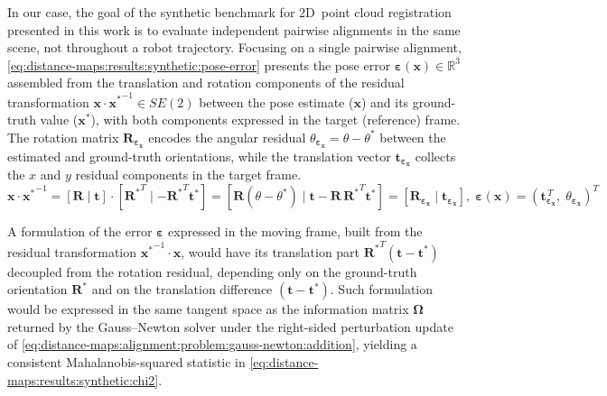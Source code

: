 In our case, the goal of the synthetic benchmark for 2D~point cloud
registration presented in this work is to evaluate independent pairwise
alignments in the same scene, not throughout a robot trajectory.
Focusing on a single pairwise alignment,
\eqref{eq:distance-maps:results:synthetic:pose-error} presents the pose
error $\boldsymbol{\varepsilon}\!\left(\mathbf{x}\right) \in \mathbb{R}^3$
assembled from the translation and rotation components of the residual
transformation $\mathbf{x}\cdot{\mathbf{x}^{*}}^{-1} \in SE(2)$ between
the pose estimate ($\mathbf{x}$) and its ground-truth value ($\mathbf{x}^*$),
with both components expressed in the target (reference) frame.
The rotation matrix $\mathbf{R}_{\boldsymbol{\varepsilon}_\mathbf{x}}$
encodes the angular residual
$\theta_{\boldsymbol{\varepsilon}_\mathbf{x}}=\theta-\theta^*$ between the
estimated and ground-truth orientations, while the translation vector
$\mathbf{t}_{\boldsymbol{\varepsilon}_\mathbf{x}}$ collects the $x$ and $y$
residual components in the target frame.
\begin{equation}
\label{eq:distance-maps:results:synthetic:pose-error}
\mathbf{x}\cdot{\mathbf{x}^{*}}^{-1} =
\left[\mathbf{R}\mid\mathbf{t}\right] \cdot
\left[{\mathbf{R}^*}^T \mid -{\mathbf{R}^*}^T\mathbf{t}^*\right] =
\left[\mathbf{R}(\theta-\theta^*) \;\big|\;
\mathbf{t} - \mathbf{R}\,{\mathbf{R}^*}^T\mathbf{t}^*\right] =
\left[\mathbf{R}_{\boldsymbol{\varepsilon}_\mathbf{x}} \;\big|\;
\mathbf{t}_{\boldsymbol{\varepsilon}_\mathbf{x}}\right],
\;
\boldsymbol{\varepsilon}\!\left(\mathbf{x}\right) =
\left(\mathbf{t}_{\boldsymbol{\varepsilon}_\mathbf{x}}^{\,T},\;
\theta_{\boldsymbol{\varepsilon}_\mathbf{x}}\right)^T
\end{equation}

A formulation of the error $\boldsymbol{\varepsilon}$ expressed in the moving
frame, built from the residual transformation
${\mathbf{x}^{*}}^{-1}\cdot\mathbf{x}$, would have its
translation part ${\mathbf{R}^*}^T\!\left(\mathbf{t}-\mathbf{t}^*\right)$
decoupled from the rotation residual, depending only on the ground-truth
orientation $\mathbf{R}^*$ and on the translation difference
$\left(\mathbf{t}-\mathbf{t}^*\right)$. Such formulation would be
expressed in the same tangent space as the information matrix
$\boldsymbol{\Omega}$ returned by the Gauss--Newton solver under the
right-sided perturbation update of
\eqref{eq:distance-maps:alignment:problem:gauss-newton:addition}, yielding
a consistent Mahalanobis-squared statistic in
\eqref{eq:distance-maps:results:synthetic:chi2}.

